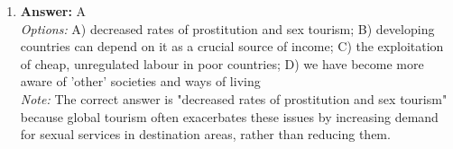 \documentclass[12pt]{article}
\begin{document}
\begin{enumerate}[label=\arabic*.]
\\ \textit{Note:} Functionalism is the correct answer because it emphasizes that society is made up of various interdependent and coordinated parts, each serving a specific function to maintain the stability and order of the whole system.
\item \textbf{Answer:} A
\\ \textit{Options:} A) decreased rates of prostitution and sex tourism; B) developing countries can depend on it as a crucial source of income; C) the exploitation of cheap, unregulated labour in poor countries; D) we have become more aware of 'other' societies and ways of living
\\ \textit{Note:} The correct answer is "decreased rates of prostitution and sex tourism" because global tourism often exacerbates these issues by increasing demand for sexual services in destination areas, rather than reducing them.
\end{enumerate}
\end{document}
